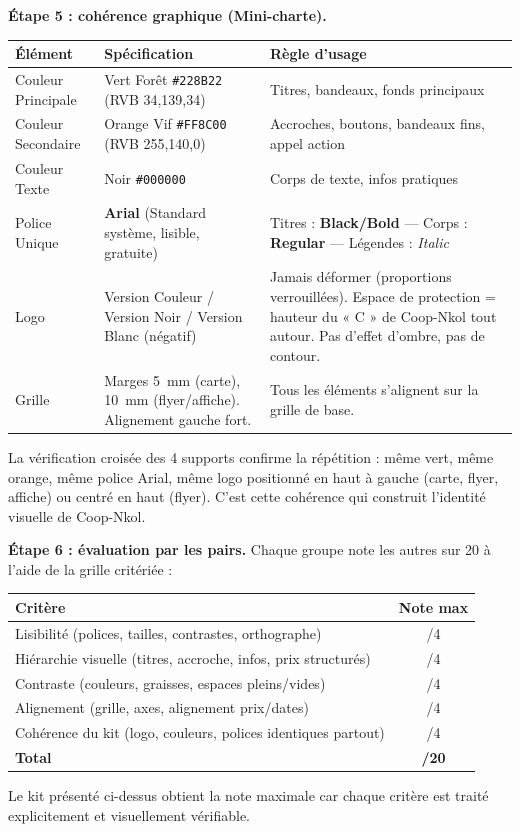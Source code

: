 \documentclass[11pt]{article}
\newcommand{\cle}[1]{{\popxbold\color{popdark}#1}}
\begin{document}
\begin{exoresolu}
\textbf{Étape 5 : cohérence graphique (Mini-charte).}
\begin{center}
\begin{tabularx}{\linewidth}{|l|X|X|}
\hline
\rowcolor{popblueL} \textbf{Élément} & \textbf{Spécification} & \textbf{Règle d'usage} \\
\hline
Couleur Principale & Vert Forêt \texttt{\#228B22} (RVB 34,139,34) & Titres, bandeaux, fonds principaux \\
Couleur Secondaire & Orange Vif \texttt{\#FF8C00} (RVB 255,140,0) & Accroches, boutons, bandeaux fins, appel action \\
Couleur Texte & Noir \texttt{\#000000} & Corps de texte, infos pratiques \\
\hline
Police Unique & \textbf{Arial} (Standard système, lisible, gratuite) & Titres : \textbf{Black/Bold} — Corps : \textbf{Regular} — Légendes : \textit{Italic} \\
\hline
Logo & Version Couleur / Version Noir / Version Blanc (négatif) & Jamais déformer (proportions verrouillées). Espace de protection = hauteur du « C » de Coop-Nkol tout autour. Pas d'effet d'ombre, pas de contour. \\
\hline
Grille & Marges 5~mm (carte), 10~mm (flyer/affiche). Alignement gauche fort. & Tous les éléments s'alignent sur la grille de base. \\
\hline
\end{tabularx}
\end{center}
La vérification croisée des 4 supports confirme la \cle{répétition} : même vert, même orange, même police Arial, même logo positionné en haut à gauche (carte, flyer, affiche) ou centré en haut (flyer). C'est cette cohérence qui construit l'\cle{identité visuelle} de Coop-Nkol.

\textbf{Étape 6 : évaluation par les pairs.}
Chaque groupe note les autres sur 20 à l'aide de la grille critériée :
\begin{center}
\begin{tabular}{|l|c|}
\hline
\rowcolor{popblueL} \textbf{Critère} & \textbf{Note max} \\
\hline
Lisibilité (polices, tailles, contrastes, orthographe) & /4 \\
Hiérarchie visuelle (titres, accroche, infos, prix structurés) & /4 \\
Contraste (couleurs, graisses, espaces pleins/vides) & /4 \\
Alignement (grille, axes, alignement prix/dates) & /4 \\
Cohérence du kit (logo, couleurs, polices identiques partout) & /4 \\
\hline
\textbf{Total} & \textbf{/20} \\
\hline
\end{tabular}
\end{center}
Le kit présenté ci-dessus obtient la note maximale car chaque critère est traité explicitement et visuellement vérifiable.
\end{exoresolu}
\end{document}
